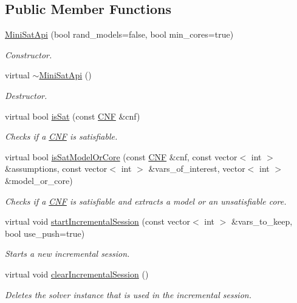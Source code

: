 \subsection*{Public Member Functions}
\begin{DoxyCompactItemize}
\item 
\hyperlink{classMiniSatApi_a1252284d34189f954aaf497b3441b182}{Mini\-Sat\-Api} (bool rand\-\_\-models=false, bool min\-\_\-cores=true)
\begin{DoxyCompactList}\small\item\em Constructor. \end{DoxyCompactList}\item 
virtual \hyperlink{classMiniSatApi_ac45e31c4ce50ddd87df83d97d4c3ac2e}{$\sim$\-Mini\-Sat\-Api} ()
\begin{DoxyCompactList}\small\item\em Destructor. \end{DoxyCompactList}\item 
virtual bool \hyperlink{classMiniSatApi_a73b93ecb947723a96ef6fbd436640e12}{is\-Sat} (const \hyperlink{classCNF}{C\-N\-F} \&cnf)
\begin{DoxyCompactList}\small\item\em Checks if a \hyperlink{classCNF}{C\-N\-F} is satisfiable. \end{DoxyCompactList}\item 
virtual bool \hyperlink{classMiniSatApi_a7f846d8c4a5a652cb83460852c09dfb3}{is\-Sat\-Model\-Or\-Core} (const \hyperlink{classCNF}{C\-N\-F} \&cnf, const vector$<$ int $>$ \&assumptions, const vector$<$ int $>$ \&vars\-\_\-of\-\_\-interest, vector$<$ int $>$ \&model\-\_\-or\-\_\-core)
\begin{DoxyCompactList}\small\item\em Checks if a \hyperlink{classCNF}{C\-N\-F} is satisfiable and extracts a model or an unsatisfiable core. \end{DoxyCompactList}\item 
virtual void \hyperlink{classMiniSatApi_afe6f184e440ffe7f9b3a86045c15b450}{start\-Incremental\-Session} (const vector$<$ int $>$ \&vars\-\_\-to\-\_\-keep, bool use\-\_\-push=true)
\begin{DoxyCompactList}\small\item\em Starts a new incremental session. \end{DoxyCompactList}\item 
virtual void \hyperlink{classMiniSatApi_a237754c78357ed0a84894e811806b618}{clear\-Incremental\-Session} ()
\begin{DoxyCompactList}\small\item\em Deletes the solver instance that is used in the incremental session. \end{DoxyCompactList}\item 

\end{DoxyCompactItemize}
